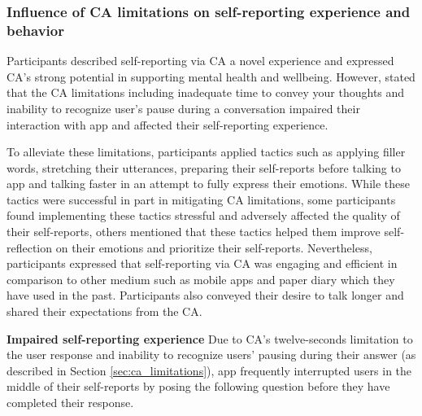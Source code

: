 \subsubsection{Influence of \ac{CA} limitations on self-reporting experience and behavior}
    Participants described self-reporting via \ac{CA} a novel experience and expressed \ac{CA}'s strong potential in supporting mental health and wellbeing. However, stated that the \ac{CA} limitations including
        inadequate time to convey your thoughts and 
        inability to recognize user's pause during a conversation 
    impaired their interaction with \acl{app} and affected their self-reporting experience. 

    To alleviate these limitations, participants applied tactics such as applying filler words, stretching their utterances, preparing their self-reports before talking to \acl{app} and talking faster in an attempt to fully express their emotions.
    While these tactics were successful in part in mitigating \ac{CA} limitations, some participants found implementing these tactics stressful and adversely affected the quality of their self-reports, others mentioned that these tactics helped them improve self-reflection on their emotions and prioritize their self-reports.
    Nevertheless, participants expressed that self-reporting via \ac{CA} was engaging and efficient in comparison to other medium such as mobile apps and paper diary which they have used in the past.
    Participants also conveyed their desire to talk longer and shared their expectations from the \ac{CA}. 
        

    \textbf{Impaired self-reporting experience}
        Due to \ac{CA}'s twelve-seconds limitation to the user response and inability to recognize users' pausing during their answer (as described in Section \ref{sec:ca_limitations}), \acl{app} frequently interrupted users in the middle of their self-reports by posing the following question before they have completed their response.
        
